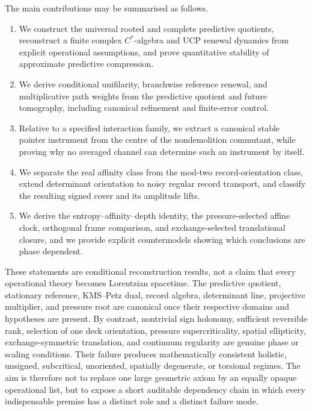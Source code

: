 \documentclass[11pt]{article}
\theoremstyle{definition}
\theoremstyle{remark}
\begin{document}
The main contributions may be summarised as follows.
\begin{enumerate}[label=\textup{(\roman*)},leftmargin=2.5em]
\item We construct the universal rooted and complete predictive quotients,
      reconstruct a finite complex $C^*$-algebra and UCP renewal dynamics from
      explicit operational assumptions, and prove quantitative stability of
      approximate predictive compression.
\item We derive conditional unifilarity, branchwise reference renewal, and
      multiplicative path weights from the predictive quotient and future
      tomography, including canonical refinement and finite-error control.
\item Relative to a specified interaction family, we extract a canonical
      stable pointer instrument from the centre of the nondemolition
      commutant, while proving why no averaged channel can determine such an
      instrument by itself.
\item We separate the real affinity class from the mod-two record-orientation
      class, extend determinant orientation to noisy regular record transport,
      and classify the resulting signed cover and its amplitude lifts.
\item We derive the entropy--affinity--depth identity, the pressure-selected
      affine clock, orthogonal frame comparison, and exchange-selected
      translational closure, and we provide explicit countermodels showing
      which conclusions are phase dependent.
\end{enumerate}

These statements are conditional reconstruction results, not a claim that
every operational theory becomes Lorentzian spacetime.  The predictive
quotient, stationary reference, KMS--Petz dual, record algebra, determinant
line, projective multiplier, and pressure root are canonical once their
respective domains and hypotheses are present.  By contrast, nontrivial sign
holonomy, sufficient reversible rank, selection of one deck orientation,
pressure supercriticality, spatial ellipticity, exchange-symmetric
translation, and continuum regularity are genuine phase or scaling
conditions.  Their failure produces mathematically consistent holistic,
unsigned, subcritical, unoriented, spatially degenerate, or torsional regimes.
The aim is therefore not to replace one large geometric axiom by an equally
opaque operational list, but to expose a short auditable dependency chain in
which every indispensable premise has a distinct role and a distinct failure
mode.
\end{document}

